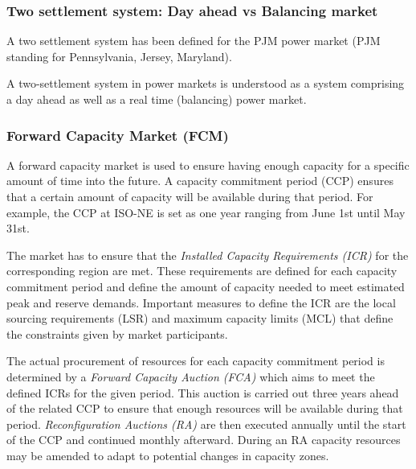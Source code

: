 



\subsubsection{Two settlement system: Day ahead vs Balancing market}

A two settlement system has been defined for the PJM power market (PJM standing for Pennsylvania, Jersey, Maryland)\cite{lambert2001creating}. 

A two-settlement system in power markets is understood as a system comprising a day ahead as well as a real time (balancing) power market\cite{lambert2001creating}. 



\subsubsection{Forward Capacity Market (FCM)} 

A forward capacity market is used to ensure having enough capacity for a specific amount of time into the future. A capacity commitment period (CCP) ensures that a certain amount of capacity will be available during that period. For example, the CCP at ISO-NE is set as one year ranging from June 1st until May 31st. 

The market has to ensure that the \emph{Installed Capacity Requirements (ICR)} for the corresponding region are met. These requirements are defined for each capacity commitment period and define the amount of capacity needed to meet estimated peak and reserve demands. Important measures to define the ICR are the local sourcing requirements (LSR) and maximum capacity limits (MCL) that define the constraints given by market participants. %

The actual procurement of resources for each capacity commitment period is determined by a \emph{Forward Capacity Auction (FCA)} which aims to meet the defined ICRs for the given period.
This auction is carried out three years ahead of the related CCP to ensure that enough resources will be available during that period. \emph{Reconfiguration Auctions (RA)} are then executed annually until the start of the CCP and continued monthly afterward. During an RA capacity resources may be amended to adapt to potential changes in capacity zones. 

